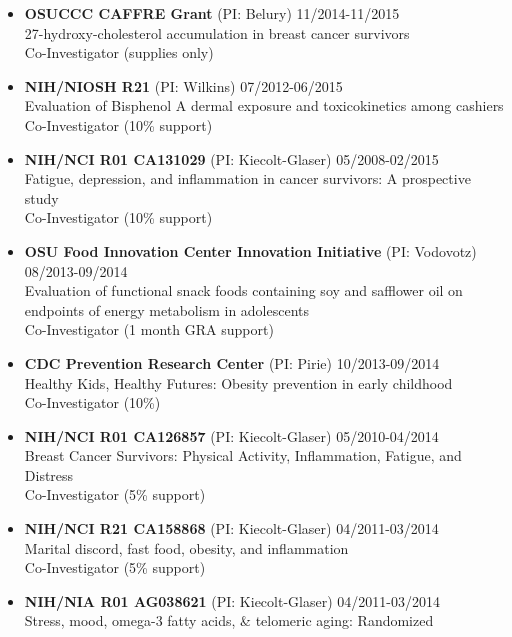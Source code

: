\documentclass[
  english,
  letterpaper,
  DIV=11,
  numbers=noendperiod]{scrartcl}
\begin{document}
\begin{itemize}
  \textbf{NIH R21CA185140 S1} (PI: Belury) {01/2015-12/2015}\\
  Naringenin and sarcopenia\\
  Co-Investigator (3\% support; 1.8 months GRA support)
\item
  \textbf{OSUCCC CAFFRE Grant} (PI: Belury) {11/2014-11/2015}\\
  27-hydroxy-cholesterol accumulation in breast cancer survivors\\
  Co-Investigator (supplies only)
\item
  \textbf{NIH/NIOSH R21} (PI: Wilkins) {07/2012-06/2015}\\
  Evaluation of Bisphenol A dermal exposure and toxicokinetics among
  cashiers\\
  Co-Investigator (10\% support)
\item
  \textbf{NIH/NCI R01 CA131029} (PI: Kiecolt-Glaser) {05/2008-02/2015}\\
  Fatigue, depression, and inflammation in cancer survivors: A
  prospective study\\
  Co-Investigator (10\% support)
\item
  \textbf{OSU Food Innovation Center Innovation Initiative} (PI:
  Vodovotz) {08/2013-09/2014}\\
  Evaluation of functional snack foods containing soy and safflower oil
  on endpoints of energy metabolism in adolescents\\
  Co-Investigator (1 month GRA support)
\item
  \textbf{CDC Prevention Research Center} (PI: Pirie)
  {10/2013-09/2014}\\
  Healthy Kids, Healthy Futures: Obesity prevention in early childhood\\
  Co-Investigator (10\%)
\item
  \textbf{NIH/NCI R01 CA126857} (PI: Kiecolt-Glaser) {05/2010-04/2014}\\
  Breast Cancer Survivors: Physical Activity, Inflammation, Fatigue, and
  Distress\\
  Co-Investigator (5\% support)
\item
  \textbf{NIH/NCI R21 CA158868} (PI: Kiecolt-Glaser) {04/2011-03/2014}\\
  Marital discord, fast food, obesity, and inflammation\\
  Co-Investigator (5\% support)
\item
  \textbf{NIH/NIA R01 AG038621} (PI: Kiecolt-Glaser) {04/2011-03/2014}\\
  Stress, mood, omega-3 fatty acids, \& telomeric aging: Randomized

\end{itemize}
\end{document}
